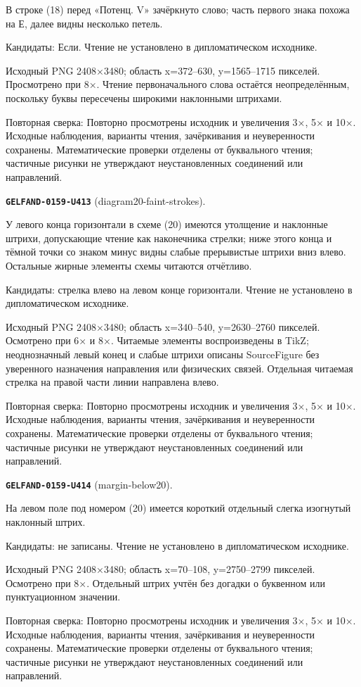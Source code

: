 В строке (18) перед «Потенц. V» зачёркнуто слово; часть первого знака похожа на Е, далее видны несколько петель.\par
Кандидаты: Если. Чтение не установлено в дипломатическом исходнике.\par
Исходный PNG 2408×3480; область x=372–630, y=1565–1715 пикселей. Просмотрено при 8×. Чтение первоначального слова остаётся неопределённым, поскольку буквы пересечены широкими наклонными штрихами.\par
Повторная сверка: Повторно просмотрены исходник и увеличения 3×, 5× и 10×. Исходные наблюдения, варианты чтения, зачёркивания и неуверенности сохранены. Математические проверки отделены от буквального чтения; частичные рисунки не утверждают неустановленных соединений или направлений.\par\medskip
\par\noindent\leavevmode{}\label{GELFAND-0159-U413}\label{GELFAND-P001471:diagram20-faint-strokes}\textbf{\texttt{GELFAND-0159-U413}} (diagram20-faint-strokes).\nopagebreak[4]\par
У левого конца горизонтали в схеме (20) имеются утолщение и наклонные штрихи, допускающие чтение как наконечника стрелки; ниже этого конца и тёмной точки со знаком минус видны слабые прерывистые штрихи вниз влево. Остальные жирные элементы схемы читаются отчётливо.\par
Кандидаты: стрелка влево на левом конце горизонтали. Чтение не установлено в дипломатическом исходнике.\par
Исходный PNG 2408×3480; область x=340–540, y=2630–2760 пикселей. Осмотрено при 6× и 8×. Читаемые элементы воспроизведены в TikZ; неоднозначный левый конец и слабые штрихи описаны SourceFigure без уверенного назначения направления или физических связей. Отдельная читаемая стрелка на правой части линии направлена влево.\par
Повторная сверка: Повторно просмотрены исходник и увеличения 3×, 5× и 10×. Исходные наблюдения, варианты чтения, зачёркивания и неуверенности сохранены. Математические проверки отделены от буквального чтения; частичные рисунки не утверждают неустановленных соединений или направлений.\par\medskip
\par\noindent\leavevmode{}\label{GELFAND-0159-U414}\label{GELFAND-P001471:margin-below20}\textbf{\texttt{GELFAND-0159-U414}} (margin-below20).\nopagebreak[4]\par
На левом поле под номером (20) имеется короткий отдельный слегка изогнутый наклонный штрих.\par
Кандидаты: не записаны. Чтение не установлено в дипломатическом исходнике.\par
Исходный PNG 2408×3480; область x=70–108, y=2750–2799 пикселей. Осмотрено при 8×. Отдельный штрих учтён без догадки о буквенном или пунктуационном значении.\par
Повторная сверка: Повторно просмотрены исходник и увеличения 3×, 5× и 10×. Исходные наблюдения, варианты чтения, зачёркивания и неуверенности сохранены. Математические проверки отделены от буквального чтения; частичные рисунки не утверждают неустановленных соединений или направлений.\par\medskip

